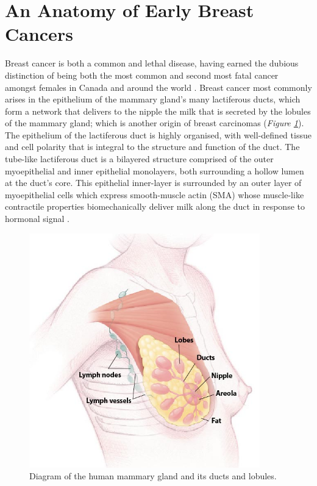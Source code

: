 \section{An Anatomy of Early Breast Cancers}
Breast cancer is both a common and lethal disease, having earned the dubious distinction of being both the most common and second most fatal cancer amongst females in Canada and around the world \citep{ccs2015}. Breast cancer most commonly arises in the epithelium of the mammary gland's many lactiferous ducts, which form a network that delivers to the nipple the milk that is secreted by the lobules of the mammary gland; which is another origin of breast carcinomas (\emph{Figure \ref{anatomy}}). The epithelium of the lactiferous duct is highly organised, with well-defined tissue and cell polarity that is integral to the structure and function of the duct. The tube-like lactiferous duct is a bilayered structure comprised of the outer myoepithelial and inner epithelial monolayers, both surrounding a hollow lumen at the duct's core. This epithelial inner-layer is surrounded by an outer layer of myoepithelial cells which express smooth-muscle actin (SMA) whose muscle-like contractile properties biomechanically deliver milk along the duct in response to hormonal signal \citep{Hamperl_1970}.\par

\begin{figure}[ht!]
	\centering
	\includegraphics[width=100mm]{figures/breast_anatomy.jpg}
	\caption{Diagram of the human mammary gland and its ducts and lobules. \citep{NIH_2010} \label{anatomy}}
\end{figure}

